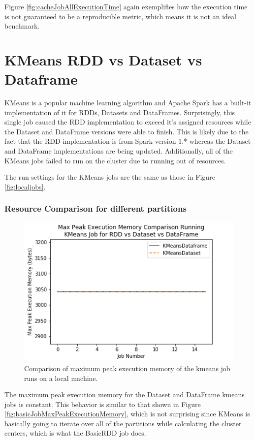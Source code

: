 \documentclass[conference]{IEEEtran}
\begin{document}
Figure \ref{fig:cacheJobAllExecutionTime} again exemplifies how the execution time is not guaranteed to be a reproducible metric, which means it is not an ideal benchmark.

\section{KMeans RDD vs Dataset vs Dataframe}
KMeans is a popular machine learning algorithm and Apache Spark has a built-it implementation of it for RDDs, Datasets and DataFrames.
Surprisingly, this single job caused the RDD implementation to exceed it's assigned resources while the Dataset and DataFrame versions were able to finish.
This is likely due to the fact that the RDD implementation is from Spark version 1.* whereas the Dataset and DataFrame implementations are being updated.
Additionally, all of the KMeans jobs failed to run on the cluster due to running out of resources.

The run settings for the KMeans jobs are the same as those in Figure \ref{fig:localjobs}.

\subsubsection{Resource Comparison for different partitions}
\begin{figure}
    \includegraphics[width=\linewidth]{../python_scripts/images/kmeansJobMaxPeakExecutionMemory.png}
    \caption{Comparison of maximum peak execution memory of the kmeans job runs on a local machine.}
    \label{fig:kmeansJobMaxPeakExecutionMemory}
\end{figure}

The maximum peak execution memory for the Dataset and DataFrame kmeans jobs is constant.
This behavior is similar to that shown in Figure \ref{fig:basicJobMaxPeakExecutionMemory}, which is not surprising since KMeans is basically going to iterate over all of the partitions while calculating the cluster centers, which is what the BasicRDD job does.
\end{document}
